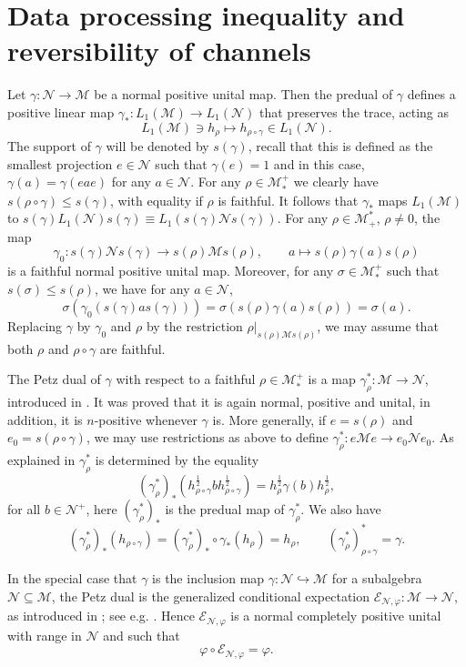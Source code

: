\documentclass[12pt]{article}
\theoremstyle{definition}
\theoremstyle{remark}
\numberwithin{equation}{section}
\def\cE{\mathcal E}
\def\Me{\mathcal M}
\def\Ne{\mathcal N}
\begin{document}
\section{Data processing inequality and reversibility of channels}

Let  $\gamma: \Ne\to \Me$ be a normal positive unital map. Then the  predual of $\gamma$  defines a 
positive linear map $\gamma_*: L_1(\Me)\to L_1(\Ne)$ that preserves the trace, acting as
\[
L_1(\Me)\ni h_\rho\mapsto h_{\rho\circ\gamma} \in L_1(\Ne).
\]
The support
of $\gamma$ will be denoted by $s(\gamma)$, recall that this is defined as the smallest projection
$e\in \Ne$ such that $\gamma(e)=1$ and in this case, $\gamma(a)=\gamma(eae)$ for any $a\in
\Ne$. For any $\rho\in \Me_*^+$ we clearly have
$s(\rho\circ\gamma)\le s(\gamma)$, with equality if $\rho$ is faithful. 
It follows that $\gamma_*$ maps $L_1(\Me)$ to $s(\gamma)L_1(\Ne)s(\gamma)\equiv
L_1(s(\gamma)\Ne s(\gamma))$.  For any $\rho\in \Me_+^*$, $\rho\ne 0$, the map
\[
\gamma_0: s(\gamma)\Ne s(\gamma)\to s(\rho)\Me s(\rho),\qquad a\mapsto s(\rho) \gamma(a)s(\rho)
\]
is a faithful normal positive unital map. Moreover, for any $\sigma\in \Me_*^+$ such that
$s(\sigma)\le s(\rho)$, we have for any $a\in \Ne$,
\[
\sigma(\gamma_0(s(\gamma)as(\gamma)))=\sigma(s(\rho)\gamma(a)s(\rho))=\sigma(a).
\]
Replacing $\gamma$ by $\gamma_0$ and $\rho$ by the restriction $\rho|_{s(\rho)\Me
s(\rho)}$, we may  assume that both $\rho$ and $\rho\circ
\gamma$ are faithful.


The Petz dual  of $\gamma$ with respect to a faithful  $\rho\in \Me_*^+$
is a map $\gamma_\rho^*:\Me\to \Ne$,
introduced in \cite{petz1988sufficiency}. It was proved that it is again
normal, positive and unital, in addition, it is $n$-positive whenever $\gamma$ is.
More generally, if $e=s(\rho)$ and $e_0=s(\rho\circ\gamma)$, we may use restrictions as
above to define $\gamma^*_\rho: e\Me e\to e_0\Ne e_0$. 
As explained in \cite{jencova2018renyi} $\gamma^*_\rho$ is determined by the equality
\begin{equation}\label{eq:petzdual}
(\gamma^*_\rho)_*(h_{\rho\circ\gamma}^{\frac12}bh_{\rho\circ\gamma}^{\frac12})=h_\rho^{\frac12}\gamma(b)h_\rho^{\frac12},
\end{equation}
for all $b\in \Ne^+$, here $(\gamma^*_\rho)_*$ is the predual map of $\gamma^*_\rho$.
We also have
\[
(\gamma^*_\rho)_*(h_{\rho\circ\gamma})=(\gamma^*_\rho)_*\circ
\gamma_*(h_\rho)=h_\rho,\qquad (\gamma_\rho^*)_{\rho\circ\gamma}^*=\gamma.
\]
 

In the special case that $\gamma$ is the
inclusion map $\gamma: \Ne\hookrightarrow \Me$ for a subalgebra $\Ne\subseteq \Me$, the Petz dual is the generalized 
conditional expectation $\cE_{\Ne,\varphi}:\Me\to \Ne$, as introduced in \cite{accardi}; see e.g.
\cite[Proposition 6.5]{hiai2021quantum}. Hence  $\cE_{\Ne,\varphi}$ is a normal completely
positive unital with range in $\Ne$ and such that 
\[
\varphi\circ \cE_{\Ne,\varphi}=\varphi.
\]
\end{document}
